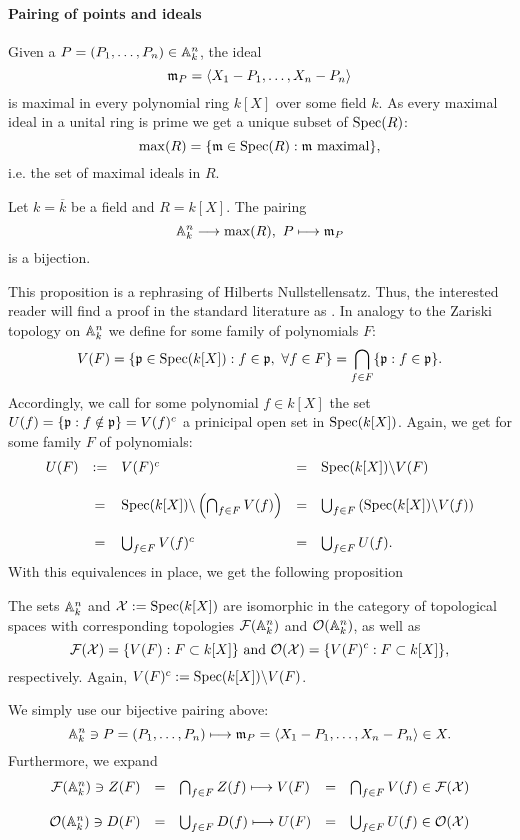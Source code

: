 \paragraph{Pairing of points and ideals}
Given a $P = (P_1,\ldots,P_n) \in \mathbb{A}^n_{k}$, the ideal
$$\mathfrak{m}_P = \left<X_1 - P_1,\ldots,X_n - P_n\right>$$
is maximal in every polynomial ring $k[X]$ over some field $k$. As every maximal ideal in a unital ring is prime we get a unique subset of $\mathrm{Spec}(R)$:
$$\max (R) = \{\mxx \in \specr : \mxx \ \mathrm{maximal}\},$$
i.e. the set of maximal ideals in $R$.
\begin{prop}
Let $k = \overline{k}$ be a field and $R = k[X]$. The pairing
$$\mathbb{A}^n_{k} \longrightarrow \max(R),\ P \longmapsto \mathfrak{m}_P$$
is a bijection.
\end{prop}
\bmk This proposition is a rephrasing of Hilberts Nullstellensatz. Thus, the interested reader will find a proof in the standard literature as \cite{Hart}. In analogy to the Zariski topology on $\mathbb{A}^n_{k}$ we define for some family of polynomials $F$:
$$V(F) = \{\prm \in \speck : f \in \prm,\ \forall f \in F\} = \bigcap_{f \in F} \{\prm : f \in \prm\}.$$
Accordingly, we call for some polynomial $f \in k[X]$ the set $U(f) = \{\mathfrak{p} : f \notin \mathfrak{p}\} = V(f)^c$ a prinicipal open set in $\mathrm{Spec}(k[X])$. Again, we get for some family $F$ of polynomials:
$$
\begin{array}{rclcl}
U(F) &:=& V(F)^c &=& \mathrm{Spec}(k[X]) \backslash V(F)\\&&&&\\ &=& \mathrm{Spec}(k[X]) \backslash \left(\bigcap_{f \in F} V(f)\right) &=& \bigcup_{f \in F} \left(\mathrm{Spec}(k[X]) \backslash V(f)\right)\\&&&&\\ &=& \bigcup_{f \in F} V(f)^c &=& \bigcup_{f \in F} U(f).\\
\end{array}
$$
With this equivalences in place, we get the following proposition
\begin{prop}
The sets $\mathbb{A}^n_{k}$ and $\mathcal{X} := \mathrm{Spec}(k[X])$ are isomorphic in the category of topological spaces with corresponding topologies $\mathcal{F}({\mathbb{A}^n_{k}})$ and $\mathcal{O}({\mathbb{A}^n_{k}})$, as well as
$$\mathcal{F}(\X) = \{V(F) : F \subset k[X]\}\ \mathrm{and}\ \mathcal{O}(\X) = \{V(F)^c : F \subset k[X]\},$$
respectively. Again, $V(F)^c := \mathrm{Spec}(k[X]) \backslash V(F)$.
\end{prop}
\bws We simply use our bijective pairing above:
$$\mathbb{A}^n_{k} \ni P = (P_1,\ldots,P_n) \longmapsto \mathfrak{m}_P = \left<X_1 - P_1,\ldots,X_n - P_n\right> \in X.$$
Furthermore, we expand
$$\begin{array}{rclcl}
\mathcal{F}({\mathbb{A}^n_{k}}) \ni Z(F) &=& \bigcap_{f \in F} Z(f) \longmapsto V(F) &=& \bigcap_{f \in F} V(f) \in \mathcal{F}(\mathcal{X})\\&&&&\\
\mathcal{O}({\mathbb{A}^n_{k}}) \ni D(F) &=& \bigcup_{f \in F} D(f) \longmapsto U(F) &=& \bigcup_{f \in F} U(f) \in \mathcal{O}(\mathcal{X})\\
\end{array}$$